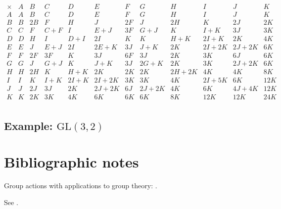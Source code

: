 \documentclass[11pt,oneside]{article}
\newcommand{\GL}{\mathrm{GL}}
\newcommand{\thinplus}{\!+\!}
\begin{document}
$$
\begin{array}{r|rrrrrrrrrrr}
\times & A & B & C & D & E & F & G & H & I & J & K \\
\hline
A & A & B & C & D & E & F & G & H & I & J & K \\
B & B & 2B & F & H & J & 2F & J & 2H & K & 2J & 2K \\
C & C & F & C\thinplus F & I & E\thinplus J & 3F & G\thinplus J & K & I\thinplus K & 3J & 3K \\
D & D & H & I & D\thinplus I & 2I & K & K & H\thinplus K & 2I\thinplus K & 2K & 4K \\
E & E & J & E\thinplus J & 2I & 2E\thinplus K & 3J & J\thinplus K & 2K & 2I\thinplus 2K & 2J\thinplus 2K & 6K \\
F & F & 2F & 3F & K & 3J & 6F & 3J & 2K & 3K & 6J & 6K \\
G & G & J & G\thinplus J & K & J\thinplus K & 3J & 2G\thinplus K & 2K & 3K & 2J\thinplus 2K & 6K \\
H & H & 2H & K & H\thinplus K & 2K & 2K & 2K & 2H\thinplus 2K & 4K & 4K & 8K \\
I & I & K & I\thinplus K & 2I\thinplus K & 2I\thinplus 2K & 3K & 3K & 4K & 2I\thinplus 5K & 6K & 12K \\
J & J & 2J & 3J & 2K & 2J\thinplus 2K & 6J & 2J\thinplus 2K & 4K & 6K & 4J\thinplus 4K & 12K \\
K & K & 2K & 3K & 4K & 6K & 6K & 6K & 8K & 12K & 12K & 24K \\
\end{array}
$$

\subsection{Example: $\GL(3, 2)$}




\section{Bibliographic notes}

Group actions with applications to group theory: \cite{ConradGroup,ConradTransitive}.

See \cite{Dress1971}.


{}

\end{document}
